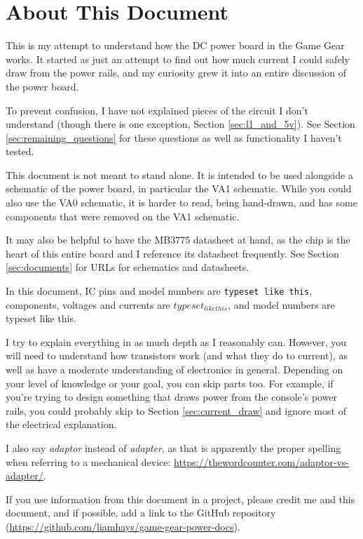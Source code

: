 \documentclass{article}
\newcommand{\chippin}{\texttt}
\newcommand{\model}{\textsf}
\begin{document}
\frenchspacing %
\section{About This Document}
This is my attempt to understand how the DC power board in the Game
Gear works. It started as just an attempt to find out how much current
I could safely draw from the power rails, and my curiosity grew it
into an entire discussion of the power board.

To prevent confusion, I have not explained pieces of the circuit I
don't understand (though there is one exception, Section
\ref{sec:l1_and_5v}). See Section \ref{sec:remaining_questions} for
these questions as well as functionality I haven't tested.

This document is not meant to stand alone. It is intended to be used
alongside a schematic of the power board, in particular the
\model{VA1} schematic. While you could also use the \model{VA0}
schematic, it is harder to read, being hand-drawn, and has some
components that were removed on the \model{VA1} schematic.

It may also be helpful to have the \model{MB3775} datasheet at hand,
as the chip is the heart of this entire board and I reference its
datasheet frequently. See Section \ref{sec:documents} for URLs for
schematics and datasheets.

In this document, IC pins and model numbers are \chippin{typeset like
  this}, components, voltages and currents are $typeset_{like this}$,
and model numbers are \model{typeset like this}.

I try to explain everything in as much depth as I reasonably
can. However, you will need to understand how transistors work (and
what they do to current), as well as have a moderate understanding of
electronics in general. Depending on your level of knowledge or your
goal, you can skip parts too. For example, if you're trying to design
something that draws power from the console's power rails, you could
probably skip to Section \ref{sec:current_draw} and ignore most of the
electrical explanation.

I also say \textit{adaptor} instead of \textit{adapter}, as that is
apparently the proper spelling when referring to a mechanical device:
\url{https://thewordcounter.com/adaptor-vs-adapter/}.

If you use information from this document in a project, please credit
me and this document, and if possible, add a link to the GitHub
repository (\url{https://github.com/liamhays/game-gear-power-docs}).
\end{document}
